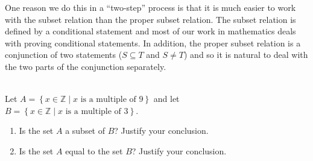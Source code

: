 One reason we do this in a ``two-step'' process is that it is much easier to work with the subset relation than the proper subset relation.  The subset relation is defined by a conditional statement and most of our work in mathematics deals with proving conditional statements.  In addition, the proper subset relation is a conjunction of two statements ($S \subseteq T$ and $S \ne T$) and so it is natural to deal with the two parts of the conjunction separately.
\hbreak

\begin{prog} \label{prog:setequality} \hfill \\
Let  $A = \left\{ x \in \mathbb{Z} \mid x \text{  is a multiple of  9} \right\}$ and let  
$B = \left\{ x \in \mathbb{Z} \mid  x \text{  is a multiple of  3} \right\}$. 
\begin{enumerate}
  \item Is the set $A$ a subset of $B$?  Justify your conclusion.  
  \item Is the set $A$ equal to the set $B$?  Justify your conclusion.
\end{enumerate}
\end{prog}



